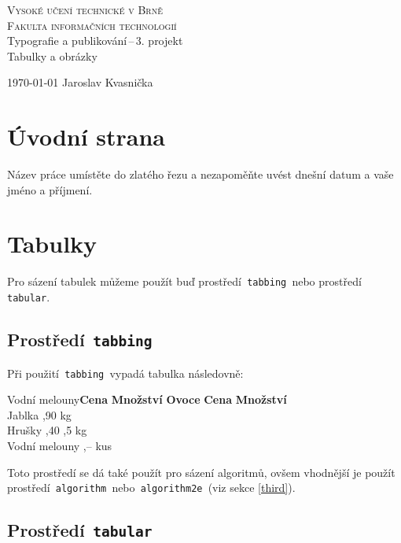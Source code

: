 \documentclass[a4paper,11pt]{article}
\begin{document}
\begin{titlepage}
\begin{center}
\Huge\textsc{Vysoké učení technické v Brně} \\
\huge\textsc{Fakulta informačních technologií}
\\
\LARGE Typografie a publikování\,--\,3. projekt \\ \Huge{Tabulky a obrázky} 
\end{center}
{\Large \today \hfill
Jaroslav Kvasnička}
\end{titlepage}


\section{Úvodní strana}
Název práce umístěte do zlatého řezu a nezapoměňte uvést dnešní datum a vaše jméno a příjmení.

\section{Tabulky}
Pro sázení tabulek můžeme použít buď prostředí\texttt{ tabbing }nebo prostředí\texttt{ tabular}.


\subsection{Prostředí\texttt{ tabbing}}


Při použití\texttt{ tabbing }vypadá tabulka následovně:
\begin{tabbing}
Vodní melouny\quad  \=\textbf{Cena} \quad   \= \textbf{Množství}        \kill
\textbf{Ovoce}      \> \textbf{Cena}        \> \textbf{Množství}        \\
Jablka              ,90                 kg                     \\
Hrušky              ,40                ,5 kg                   \\
Vodní melouny       ,--                  kus                    \\
\end{tabbing}
Toto prostředí se dá také použít pro sázení algoritmů, ovšem vhodnější je použít prostředí\texttt{ algorithm }nebo\texttt{ algorithm2e }(viz sekce \ref{third}).


\subsection{Prostředí\texttt{ tabular}}
\end{document}
